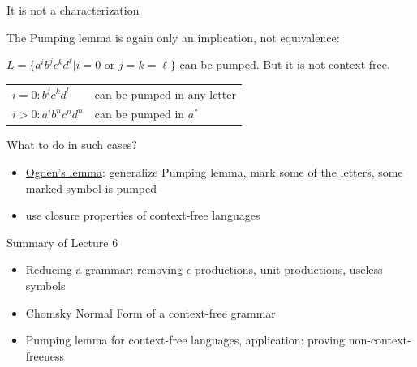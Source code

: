 \documentclass[handout]{beamer}
\begin{document}
\begin{frame}{It is not a characterization}

	The Pumping lemma is again only an implication, not equivalence:

	\begin{example}
		$L=\{a^ib^jc^kd^\ell| i=0 \text{ or } j=k=\ell\}$ can be pumped. But it is not context-free.
	\end{example}
		
	\begin{tabular}{l l}
		$i=0: b^jc^kd^l$ & can be pumped in any letter\\
		$i>0:a^ib^nc^nd^n$ & can be pumped in $a^*$
	\end{tabular}

	\medskip
	
	What to do in such cases?
	\begin{itemize}
		\item \href{https://is.cuni.cz/studium/predmety/index.php?do=predmet&kod=NTIN071}{\alert{Ogden's lemma}}: generalize Pumping lemma, mark some of the letters, some marked symbol is pumped
		\item use closure properties of context-free languages
	\end{itemize}

\end{frame}


\begin{frame}{Summary of Lecture 6}
	
	\begin{itemize}
		\item Reducing a grammar: removing $\epsilon$-productions, unit productions, useless symbols
		\item Chomsky Normal Form of a context-free grammar
		\item Pumping lemma for context-free languages, application: proving non-context-freeness
	\end{itemize}

\end{frame}
\end{document}
